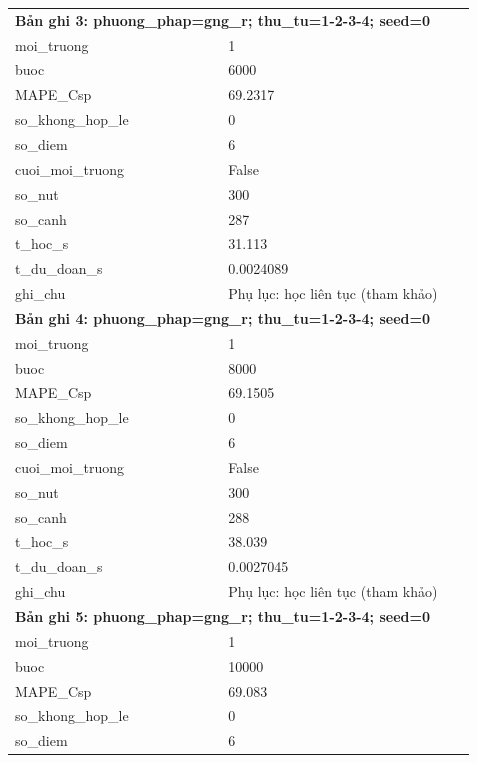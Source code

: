 \begin{longtable}{p{0.43\linewidth}p{0.50\linewidth}}
\midrule
\multicolumn{2}{p{0.95\linewidth}}{\textbf{Bản ghi 3: phuong\_phap=gng\_r; thu\_tu=1-2-3-4; seed=0}} \\
moi\_\allowbreak truong & 1 \\
buoc & 6000 \\
MAPE\_\allowbreak Csp & 69.2317 \\
so\_\allowbreak khong\_\allowbreak hop\_\allowbreak le & 0 \\
so\_\allowbreak diem & 6 \\
cuoi\_\allowbreak moi\_\allowbreak truong & False \\
so\_\allowbreak nut & 300 \\
so\_\allowbreak canh & 287 \\
t\_\allowbreak hoc\_\allowbreak s & 31.113 \\
t\_\allowbreak du\_\allowbreak doan\_\allowbreak s & 0.0024089 \\
ghi\_\allowbreak chu & Phụ lục: học liên tục (tham khảo) \\
\midrule
\multicolumn{2}{p{0.95\linewidth}}{\textbf{Bản ghi 4: phuong\_phap=gng\_r; thu\_tu=1-2-3-4; seed=0}} \\
moi\_\allowbreak truong & 1 \\
buoc & 8000 \\
MAPE\_\allowbreak Csp & 69.1505 \\
so\_\allowbreak khong\_\allowbreak hop\_\allowbreak le & 0 \\
so\_\allowbreak diem & 6 \\
cuoi\_\allowbreak moi\_\allowbreak truong & False \\
so\_\allowbreak nut & 300 \\
so\_\allowbreak canh & 288 \\
t\_\allowbreak hoc\_\allowbreak s & 38.039 \\
t\_\allowbreak du\_\allowbreak doan\_\allowbreak s & 0.0027045 \\
ghi\_\allowbreak chu & Phụ lục: học liên tục (tham khảo) \\
\midrule
\multicolumn{2}{p{0.95\linewidth}}{\textbf{Bản ghi 5: phuong\_phap=gng\_r; thu\_tu=1-2-3-4; seed=0}} \\
moi\_\allowbreak truong & 1 \\
buoc & 10000 \\
MAPE\_\allowbreak Csp & 69.083 \\
so\_\allowbreak khong\_\allowbreak hop\_\allowbreak le & 0 \\
so\_\allowbreak diem & 6 \\

\end{longtable}
